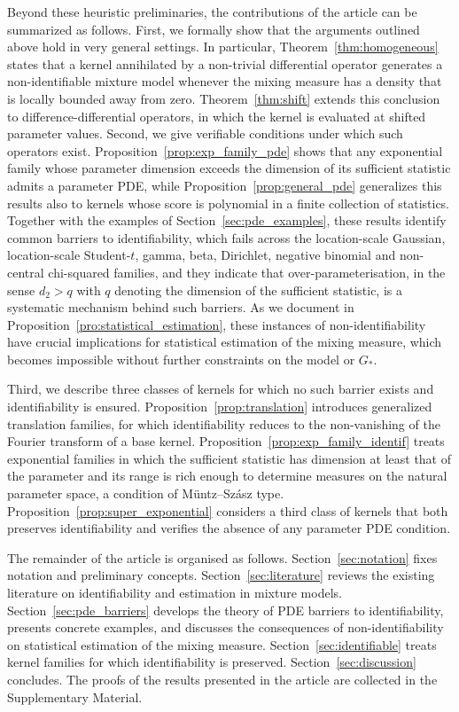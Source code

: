 \documentclass[11pt,twoside]{article} %
\begin{document}
Beyond these heuristic preliminaries, the contributions of the article can be summarized as follows. First, we formally show that the arguments outlined above hold in very general settings. In particular, Theorem~\ref{thm:homogeneous} states that a kernel annihilated by a non-trivial differential operator generates a non-identifiable mixture model whenever the mixing measure has a density that is locally bounded away from zero. Theorem~\ref{thm:shift} extends this conclusion to difference-differential operators, in which the kernel is evaluated at shifted parameter values. Second, we give verifiable conditions under which such operators exist. Proposition~\ref{prop:exp_family_pde} shows that any exponential family whose parameter dimension exceeds the dimension of its sufficient statistic admits a parameter PDE, while Proposition~\ref{prop:general_pde} generalizes this results also to kernels whose score is polynomial in a finite collection of statistics. Together with the examples of Section~\ref{sec:pde_examples}, these results identify common barriers to identifiability, which fails across the location-scale Gaussian, location-scale Student-$t$, gamma, beta, Dirichlet, negative binomial and non-central chi-squared families, and they indicate that over-parameterisation, in the sense $d_2>q$ with $q$ denoting the dimension of the sufficient statistic, is a systematic mechanism behind such barriers. As we document in Proposition~\ref{pro:statistical_estimation}, these instances of non-identifiability have crucial implications for statistical estimation of the mixing measure, which becomes impossible without further constraints on the model or $G_*$.

Third, we describe three classes of kernels for which no such barrier exists and identifiability is ensured. Proposition~\ref{prop:translation} introduces generalized translation families, for which identifiability reduces to the non-vanishing of the Fourier transform of a base kernel. Proposition~\ref{prop:exp_family_identif} treats exponential families in which the sufficient statistic has dimension at least that of the parameter and its range is rich enough to determine measures on the natural parameter space, a condition of Müntz--Szász type. Proposition~\ref{prop:super_exponential} considers a third class of kernels that both preserves identifiability and verifies the absence of any parameter PDE condition.

The remainder of the article is organised as follows. Section~\ref{sec:notation} fixes notation and preliminary concepts. Section~\ref{sec:literature} reviews the existing literature on identifiability and estimation in mixture models. Section~\ref{sec:pde_barriers} develops the theory of PDE barriers to identifiability, presents concrete examples, and discusses the consequences of non-identifiability on statistical estimation of the mixing measure. Section~\ref{sec:identifiable} treats kernel families for which identifiability is preserved. Section~\ref{sec:discussion} concludes. The proofs of the results presented in the article are collected in the Supplementary Material.
\end{document}
